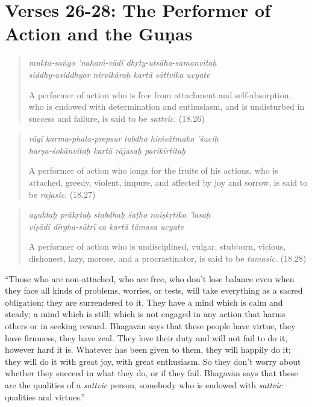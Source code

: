 \documentclass[12pt, twoside, openright]{memoir}
\begin{document}
\section{Verses 26-28: The Performer of Action and the Guṇas}\label{sec-verses-26-28-the-performer-of-action-and-the-gunas}


\par
\begin{verse}
\textit{mukta-saṅgo ’nahaṁ-vādī dhṛty-utsāha-samanvitaḥ} \\
\textit{siddhy-asiddhyor nirvikāraḥ kartā sāttvika ucyate}

\noindent A performer of action who is free from attachment and self-absorption, who is endowed with determination and enthusiasm, and is undisturbed in success and failure, is said to be \textit{sattvic}. (18.26)
\end{verse}
\par



\par
\begin{verse}
\textit{rāgī karma-phala-prepsur lubdho hiṁsātmako ’śuciḥ} \\
\textit{harṣa-śokānvitaḥ kartā rājasaḥ parikīrtitaḥ}

\noindent A performer of action who longs for the fruits of his actions, who is attached, greedy, violent, impure, and affected by joy and sorrow, is said to be \textit{rajasic}. (18.27)
\end{verse}
\par



\par
\begin{verse}
\textit{ayuktaḥ prākṛtaḥ stabdhaḥ śaṭho naiṣkṛtiko ’lasaḥ} \\
\textit{viṣādī dīrgha-sūtrī ca kartā tāmasa ucyate}

\noindent A performer of action who is undisciplined, vulgar, stubborn, vicious, dishonest, lazy, morose, and a procrastinator, is said to be \textit{tamasic}. (18.28)
\end{verse}
\par


\enquote{Those who are non-attached, who are free, who don’t lose balance even when they face all kinds of problems, worries, or tests, will take everything as a sacred obligation; they are surrendered to it. They have a mind which is calm and steady; a mind which is still; which is not engaged in any action that harms others or in seeking reward. Bhagavān says that these people have virtue, they have firmness, they have zeal. They love their duty and will not fail to do it, however hard it is. Whatever has been given to them, they will happily do it; they will do it with great joy, with great enthusiasm. So they don’t worry about whether they succeed in what they do, or if they fail. Bhagavān says that these are the qualities of a \textit{sattvic} person, somebody who is endowed with \textit{sattvic} qualities and virtues.}
\end{document}
